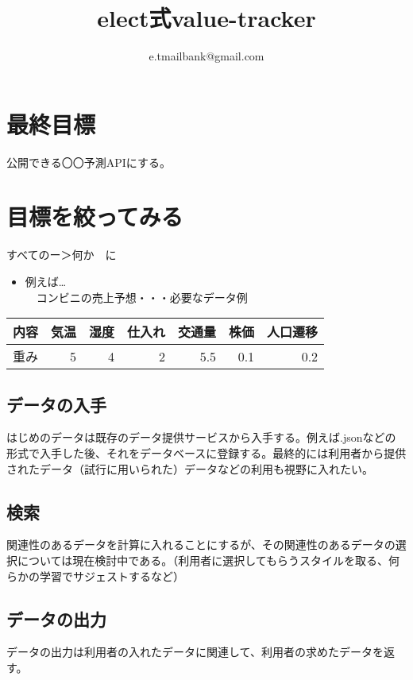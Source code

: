 \documentclass{scrartcl}
\author{e.tmailbank@gmail.com}
\date{}
\title{elect式value-tracker}
\begin{document}
\maketitle
\tableofcontents

\section{最終目標}
\label{sec:orgb654f81}
公開できる〇〇予測APIにする。\\
\section{目標を絞ってみる}
\label{sec:org0d492b3}
すべてのー＞何か　に\\
\begin{itemize}
\item 例えば\ldots{}\\
　コンビニの売上予想・・・必要なデータ例\\
\end{itemize}
\begin{center}
\begin{tabular}{lrrrrrr}
\hline
内容 & 気温 & 湿度 & 仕入れ & 交通量 & 株価 & 人口遷移\\
\hline
重み & 5 & 4 & 2 & 5.5 & 0.1 & 0.2\\
\hline
\end{tabular}
\end{center}
\subsection{データの入手}
\label{sec:org0250916}
はじめのデータは既存のデータ提供サービスから入手する。例えば.jsonなどの形式で入手した後、それをデータベースに登録する。最終的には利用者から提供されたデータ（試行に用いられた）データなどの利用も視野に入れたい。\\
\subsection{検索}
\label{sec:orgcc7c84b}
関連性のあるデータを計算に入れることにするが、その関連性のあるデータの選択については現在検討中である。（利用者に選択してもらうスタイルを取る、何らかの学習でサジェストするなど）\\
\subsection{データの出力}
\label{sec:org401a19b}
データの出力は利用者の入れたデータに関連して、利用者の求めたデータを返す。\\
\end{document}
